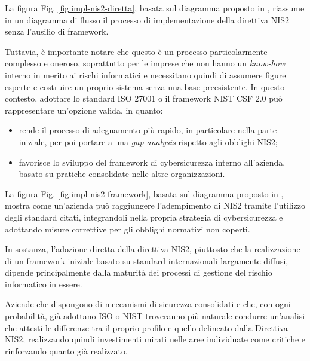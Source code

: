 La figura Fig. \ref{fig:impl-nis2-diretta}, basata sul diagramma proposto in \cite{parmar-miles-csf}, riassume in un diagramma di flusso il processo 
di implementazione della direttiva NIS2 senza l'ausilio di framework.


Tuttavia, è importante notare che questo è un processo particolarmente complesso e oneroso, soprattutto per le imprese che non hanno 
un \textit{know-how} interno in merito ai rischi informatici e necessitano quindi di assumere figure esperte e costruire un proprio sistema
senza una base preesistente. In questo contesto, adottare lo standard ISO 27001 o il framework NIST CSF 2.0 può rappresentare un'opzione valida, in quanto:
\begin{itemize}
    \item rende il processo di adeguamento più rapido, in particolare nella parte iniziale, per poi portare a una \textit{gap analysis} rispetto agli obblighi NIS2;
    \item favorisce lo sviluppo del framework di cybersicurezza interno all'azienda, basato su pratiche consolidate nelle altre organizzazioni.
\end{itemize}

La figura Fig. \ref{fig:impl-nis2-framework}, basata sul diagramma proposto in \cite{parmar-miles-csf}, mostra come un'azienda può raggiungere 
l'adempimento di NIS2 tramite l'utilizzo degli standard citati, integrandoli nella propria strategia di cybersicurezza e adottando misure correttive 
per gli obblighi normativi non coperti.


In sostanza, l'adozione diretta della direttiva NIS2, piuttosto che la realizzazione di un framework iniziale basato su standard internazionali largamente
diffusi, dipende principalmente dalla maturità dei processi di gestione del rischio informatico in essere.

Aziende che dispongono di meccanismi di sicurezza consolidati e che, con ogni probabilità, già adottano ISO o NIST troveranno più naturale condurre
un'analisi che attesti le differenze tra il proprio profilo e quello delineato dalla Direttiva NIS2, realizzando quindi investimenti mirati 
nelle aree individuate come critiche e rinforzando quanto già realizzato.

